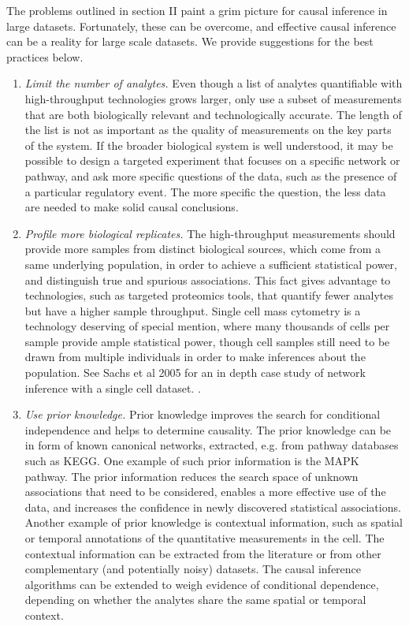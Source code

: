 \documentclass[journal=jacsat,manuscript=article]{achemso}
\begin{document}
The problems outlined in section II paint a grim picture for causal inference in large datasets. Fortunately, these can be overcome, and effective causal inference can be a reality for large scale datasets.  We provide suggestions for the best practices below.


\begin{enumerate}
\item \textit{Limit the number of analytes.} Even though a list of analytes quantifiable with high-throughput technologies grows larger, only use a subset of measurements that are both biologically relevant and technologically accurate. The length of the list is not as important as the quality of measurements on the key parts of the system.  If the broader biological system is well understood, it may be possible to design a targeted experiment that focuses on a specific network or pathway, and ask more specific questions of the data, such as the presence of a particular regulatory event.  The more specific the question, the less data are needed to make solid causal conclusions.  

\item \textit{Profile more biological replicates.}  The high-throughput measurements should provide more samples from distinct biological sources, which come from a same underlying population, in order to achieve a sufficient statistical power, and distinguish true and spurious associations.  This fact gives advantage to technologies, such as targeted proteomics tools, that quantify fewer analytes but have a higher sample throughput.  Single cell mass cytometry is a technology deserving of special mention, where many thousands of cells per sample provide ample statistical power, though cell samples still need to be drawn from multiple individuals in order to make inferences about the population. See Sachs et al 2005 for an in depth case study of network inference with a single cell dataset. \cite{sachs2005causal}.  

\item \textit{Use prior knowledge.} Prior knowledge improves the search for conditional independence and helps to determine causality. The prior knowledge can be in form of known canonical networks, extracted, e.g. from pathway databases such as KEGG. One example of such prior information is the MAPK pathway. The prior information reduces the search space of unknown associations that need to be considered, enables a more effective use of the data, and increases the confidence in newly discovered statistical associations.  Another example of prior knowledge is contextual information, such as spatial or temporal annotations of the quantitative measurements in the cell. The contextual information can be extracted from the literature or from other complementary (and potentially noisy) datasets. The causal inference algorithms can be extended to weigh evidence of conditional dependence, depending on whether the analytes share the same spatial or temporal context. 


\end{enumerate}
\end{document}
